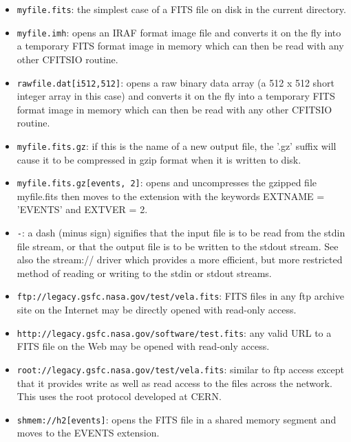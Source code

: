 \documentclass[11pt]{book}
\begin{document}
\begin{itemize}
\item
{\tt myfile.fits}: the simplest case of a FITS file on disk in the current
directory.

\item
{\tt myfile.imh}: opens an IRAF format image file and converts it on the
fly into a temporary FITS format image in memory which can then be read with
any other CFITSIO routine.

\item
{\tt rawfile.dat[i512,512]}: opens a raw binary data array (a 512 x 512
short integer array in this case) and converts it on the fly into a
temporary FITS format image in memory which can then be read with any
other CFITSIO routine.

\item
{\tt myfile.fits.gz}: if this is the name of a new output file, the '.gz'
suffix will cause it to be compressed in gzip format when it is written to
disk.

\item
{\tt myfile.fits.gz[events, 2]}:  opens and uncompresses the gzipped file
myfile.fits then moves to the extension with the keywords EXTNAME
= 'EVENTS' and EXTVER = 2.

\item
{\tt -}:  a dash (minus sign) signifies that the input file is to be read
from the stdin file stream, or that the output file is to be written to
the stdout stream.  See also the stream:// driver which provides a
more efficient, but more restricted method of reading or writing to
the stdin or stdout streams.

\item
{\tt ftp://legacy.gsfc.nasa.gov/test/vela.fits}:  FITS files in any ftp
archive site on the Internet may be directly opened with read-only
access.

\item
{\tt http://legacy.gsfc.nasa.gov/software/test.fits}: any valid URL to a
FITS file on the Web may be opened with read-only access.

\item
{\tt root://legacy.gsfc.nasa.gov/test/vela.fits}: similar to ftp access
except that it provides write as well as read access to the files
across the network. This uses the root protocol developed at CERN.

\item
{\tt shmem://h2[events]}: opens the FITS file in a shared memory segment and
moves to the EVENTS extension.


\end{itemize}
\end{document}
